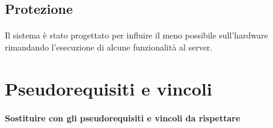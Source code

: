 \subsection{Protezione }
\paragraph{} 
Il sistema è stato progettato per influire il meno possibile sull’hardware rimandando l’esecuzione di alcune funzionalità al server. 


\section{Pseudorequisiti e vincoli}
\paragraph{Sostituire con gli pseudorequisiti e vincoli da rispettare \\}


\clearpage